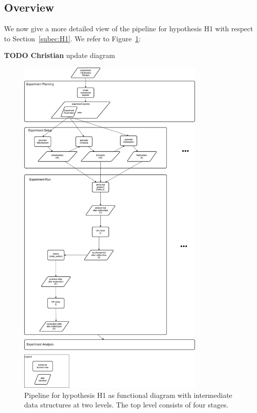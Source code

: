 \documentclass{article}
\begin{document}
\subsection{Overview}\label{subsubsec:H1overview}
We now give a more detailed view of the pipeline for hypothesis H1 with respect to Section~\ref{subec:H1}. We refer to Figure~\ref{fig:H1_overview}:
%
\begin{mdframed}
{\bf TODO Christian} update diagram
\end{mdframed}
\begin{figure}[hbtp]
	\centering
  \includegraphics[width=0.8\textwidth]{H1_overview.png}
	\caption{Pipeline for hypothesis H1 as functional diagram with intermediate data structures at two levels. The top level consists of four stages.}
	\label{fig:H1_overview}
\end{figure}
\end{document}
